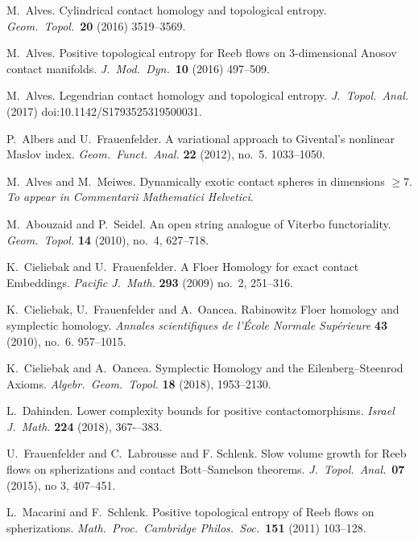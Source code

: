 \documentclass{amsart}
\theoremstyle{definition}
\theoremstyle{remark}
\numberwithin{equation}{section}
\begin{document}
\begin{thebibliography}{xxxx}

M.\ Alves.
Cylindrical contact homology and topological entropy.
{\it Geom.\ Topol.}~{\bf 20} (2016) 3519--3569.

M.\ Alves.
Positive topological entropy for Reeb flows on $3$-dimensional Anosov contact manifolds. 
{\it J.\ Mod.\ Dyn.}~{\bf 10} (2016) 497--509.

M.\ Alves.
Legendrian contact homology and topological entropy.
{\it J.\ Topol.\ Anal.} (2017) doi:10.1142/S1793525319500031.

P.\ Albers and U.\ Frauenfelder. 
A variational approach to Givental's nonlinear Maslov index. 
{\it Geom.\ Funct.\ Anal.} {\bf 22} (2012), no.~5. 1033--1050.

M.\ Alves and M.\ Meiwes.
Dynamically exotic contact spheres in dimensions $\geq7$.
{\it To appear in Commentarii Mathematici Helvetici}.

M.\ Abouzaid and P.\ Seidel.
An open string analogue of Viterbo functoriality.
{\it Geom.\ Topol.} {\bf 14} (2010), no.~4, 627--718.

K.\ Cieliebak and U.\ Frauenfelder.
A Floer Homology for exact contact Embeddings.
{\it Pacific J.\ Math.} {\bf 293} (2009) no.~2, 251--316. 

K.\ Cieliebak, U.\ Frauenfelder and A.\ Oancea. 
Rabinowitz Floer homology and symplectic homology.
{\it Annales scientifiques de l'\'Ecole Normale Sup\'erieure} {\bf 43} (2010), no.~6. 957--1015.

K.\ Cieliebak and A.\ Oancea.
Symplectic Homology and the Eilenberg--Steenrod Axioms.
{\it Algebr.\ Geom.\ Topol.} {\bf 18} (2018), 1953--2130.

L.\ Dahinden.
Lower complexity bounds for positive contactomorphisms.
{\it Israel J.\ Math.} {\bf 224} (2018), 367-–383.

U.\ Frauenfelder and C.\ Labrousse and F. Schlenk. 
Slow volume growth for Reeb flows on spherizations and contact Bott--Samelson theorems.
 {\it J.\ Topol.\ Anal.}~{\bf 07} (2015), no 3, 407--451.

L.\ Macarini and F.\ Schlenk.
 Positive topological entropy of Reeb flows on spherizations. {\it Math.\ Proc.\ Cambridge Philos.\ Soc.}~{\bf 151} (2011) 103--128.


\end{thebibliography}
\end{document}
